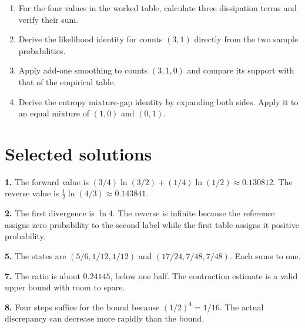 \documentclass[11pt,oneside,openany]{book}
\theoremstyle{definition}
\theoremstyle{remark}
\newenvironment{exercises}{\begin{enumerate}[label=\thechapter.\arabic*,ref=\thechapter.\arabic*,leftmargin=2.8em,itemsep=6pt]}{\end{enumerate}}
\numberwithin{equation}{chapter}
\begin{document}
\begin{exercises}
How many steps guarantee a factor-of-sixteen reduction in the contraction bound for \(\lambda=1/2\)? State why this need not be the first step at which the actual value meets that threshold.

\item 

For the four values in the worked table, calculate three dissipation terms and verify their sum.

\item 

Derive the likelihood identity for counts \((3,1)\) directly from the two sample probabilities.

\item 

Apply add-one smoothing to counts \((3,1,0)\) and compare its support with that of the empirical table.

\item 

Derive the entropy mixture-gap identity by expanding both sides. Apply it to an equal mixture of \((1,0)\) and \((0,1)\).

\end{exercises}

\section{Selected solutions}\label{ch06-selected-solutions}

\textbf{1.} The forward value is \((3/4)\ln(3/2)+(1/4)\ln(1/2)\approx0.130812\). The reverse value is \(\tfrac12\ln(4/3)\approx0.143841\).

\textbf{2.} The first divergence is \(\ln4\). The reverse is infinite because the reference assigns zero probability to the second label while the first table assigns it positive probability.

\textbf{5.} The states are \((5/6,1/12,1/12)\) and \((17/24,7/48,7/48)\). Each sums to one.

\textbf{7.} The ratio is about \(0.24145\), below one half. The contraction estimate is a valid upper bound with room to spare.

\textbf{8.} Four steps suffice for the bound because \((1/2)^4=1/16\). The actual discrepancy can decrease more rapidly than the bound.
\end{document}
